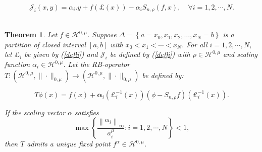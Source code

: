 \documentclass[10pt,a4paper]{amsart}
\newtheorem{theorem}{Theorem}
\begin{document}
	\begin{equation}\label{deffi}
		\mathcal{J}_i(x,y)=\alpha_{i}.y+f(\pounds(x))-\alpha_{i}S_{n,\rho}(f, x), \quad \forall i=1,2,\cdots,N.
	\end{equation}\\

	\begin{theorem}\label{Thml}
		Let $f \in \mathcal{H}^{0,\mu}$. Suppose $\Delta=\left\{a=x_{0}, x_{1}, x_{2}, \ldots, x_{N}=b\right\}$ is a partition of closed interval $[a,b]$ with $x_{0}<x_{1}<\cdots<x_{N}$. For all $i =1,2,\cdots,N$, let $\pounds_{i}$ be given by (\ref{defli}) and $\mathcal{J}_i$ be defined by (\ref{deffi}) with $\rho \in \mathcal{H}^{0,\mu}$ and scaling function
		$\alpha_{i} \in \mathcal{H}^{0,\mu}$. Let the RB-operator $T:\left(\mathcal{H}^{0,\mu},\|\cdot\|_{0, \mu}\right) \rightarrow\left(\mathcal{H}^{0,\mu},\|\cdot\|_{0, \mu}\right)$  be defined by:
		
		\begin{equation*}
			T\phi(x)=f(x)+\boldsymbol{\alpha}_{i}\left(\pounds_{i}^{-1}(x)\right)\left(\phi-S_{n,\rho} f\right)\left(\pounds_{i}^{-1}(x)\right).
		\end{equation*}
		
		\noindent If the scaling vector $\alpha$ satisfies 
		\begin{equation}\label{scale}
			\max \left\{\frac{\left\|\alpha_{i}\right\|_{\infty}}{a_{i}^{\mu}}: i =1,2,\cdots,N\right\}<1,
		\end{equation} then  $T$ admits a unique fixed point $f^{\alpha} \in \mathcal{H}^{0,\mu}$.\\
	\end{theorem}
\end{document}
